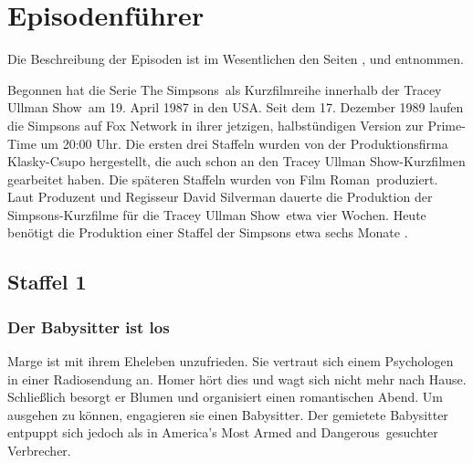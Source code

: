 \chapter{Episodenführer}\label{EpisodenFuehrer}
Die Beschreibung der Episoden ist im Wesentlichen den Seiten \cite{Epguides}, \cite{Fernsehserien} und \cite{SpringfieldShopper} entnommen.

Begonnen hat die Serie \glqq The Simpsons\grqq\ als Kurzfilmreihe innerhalb der \glqq Tracey Ullman Show\grqq\ am 19. April 1987 in den USA. Seit dem 17. Dezember 1989 laufen die Simpsons auf Fox Network in ihrer jetzigen, halbstündigen Version zur Prime-Time um 20:00 Uhr.
Die ersten drei Staffeln wurden von der Produktionsfirma Klasky-Csupo hergestellt, die auch schon an den \glqq Tracey Ullman Show\grqq -Kurzfilmen gearbeitet haben. Die späteren Staffeln wurden von \glqq Film Roman\grqq\ produziert.
Laut Produzent und Regisseur David Silverman dauerte die Produktion der Simpsons-Kurzfilme für die \glqq Tracey Ullman Show\grqq\ etwa vier Wochen. Heute benötigt die Produktion einer Staffel der Simpsons etwa sechs Monate \cite{PRO7St01}.

\section{Staffel 1}

\subsection{Der Babysitter ist los}\label{7G01}
Marge ist mit ihrem Eheleben unzufrieden. Sie vertraut sich einem Psychologen in einer Radiosendung an. Homer hört dies und wagt sich nicht mehr nach Hause. Schließlich besorgt er Blumen und organisiert einen romantischen Abend. Um ausgehen zu können, engagieren sie einen Babysitter. Der gemietete Babysitter entpuppt sich jedoch als in \glqq America's Most Armed and Dangerous\grqq\ gesuchter Verbrecher.



